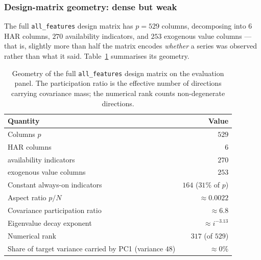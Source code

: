 
\subsubsection{Design-matrix geometry: dense but weak}

The full \texttt{all\_features} design matrix has $p = 529$ columns, decomposing
into $6$ HAR columns, $270$ availability indicators, and $253$ exogenous value
columns --- that is, slightly more than half the matrix encodes \emph{whether} a
series was observed rather than what it said. Table~\ref{tab:desc_geometry}
summarises its geometry.

\begin{table}[H]
\centering
\caption{Geometry of the full \texttt{all\_features} design matrix on the
evaluation panel. The participation ratio is the effective number of directions
carrying covariance mass; the numerical rank counts non-degenerate directions.}
\label{tab:desc_geometry}
\begin{tabular}{lr}
\toprule
Quantity & Value \\
\midrule
Columns $p$                                   & $529$ \\
\quad HAR columns                             & $6$ \\
\quad availability indicators                 & $270$ \\
\quad exogenous value columns                 & $253$ \\
Constant always-on indicators                 & $164$ ($31\%$ of $p$) \\
Aspect ratio $p/N$                            & $\approx 0.0022$ \\
Covariance participation ratio                & $\approx 6.8$ \\
Eigenvalue decay exponent                     & $\approx i^{-3.13}$ \\
Numerical rank                                & $317$ (of $529$) \\
Share of target variance carried by PC1 (variance $48$) & $\approx 0\%$ \\
\bottomrule
\end{tabular}
\end{table}

